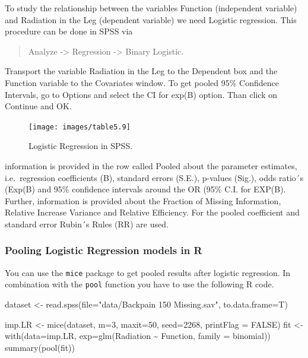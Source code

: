 \documentclass[
]{book}
\newenvironment{Shaded}{\begin{snugshade}}{\end{snugshade}}
\newcommand{\AttributeTok}[1]{\textcolor[rgb]{0.77,0.63,0.00}{#1}}
\newcommand{\ConstantTok}[1]{\textcolor[rgb]{0.00,0.00,0.00}{#1}}
\newcommand{\DecValTok}[1]{\textcolor[rgb]{0.00,0.00,0.81}{#1}}
\newcommand{\FunctionTok}[1]{\textcolor[rgb]{0.00,0.00,0.00}{#1}}
\newcommand{\NormalTok}[1]{#1}
\newcommand{\OtherTok}[1]{\textcolor[rgb]{0.56,0.35,0.01}{#1}}
\newcommand{\SpecialCharTok}[1]{\textcolor[rgb]{0.00,0.00,0.00}{#1}}
\newcommand{\StringTok}[1]{\textcolor[rgb]{0.31,0.60,0.02}{#1}}
\begin{document}
To study the relationship between the variables Function (independent variable) and Radiation in the Leg (dependent variable) we need Logistic regression. This procedure can be done in SPSS via

\begin{quote}
Analyze -\textgreater{} Regression -\textgreater{} Binary Logistic.
\end{quote}

Transport the variable Radiation in the Leg to the Dependent box and the Function variable to the Covariates window. To get pooled 95\% Confidence Intervals, go to Options and select the CI for exp(B) option. Than click on Continue and OK.

\begin{figure}

{\centering \texttt{[image: images/table5.9]} 

}

\caption{Logistic Regression in SPSS.}\label{fig:tab5-9}
\end{figure}

information is provided in the row called Pooled about the parameter estimates, i.e.~regression coefficients (B), standard errors (S.E.), p-values (Sig.), odds ratio´s (Exp(B) and 95\% confidence intervals around the OR (95\% C.I. for EXP(B). Further, information is provided about the Fraction of Missing Information, Relative Increase Variance and Relative Efficiency. For the pooled coefficient and standard error Rubin´s Rules (RR) are used.

\hypertarget{pooling-logistic-regression-models-in-r}{%
\subsubsection{Pooling Logistic Regression models in R}\label{pooling-logistic-regression-models-in-r}}

You can use the \texttt{mice} package to get pooled results after logistic regression. In combination with the \texttt{pool} function you have to use the following R code.

\begin{Shaded}
\begin{Highlighting}[]
\NormalTok{dataset }\OtherTok{\textless{}{-}} \FunctionTok{read.spss}\NormalTok{(}\AttributeTok{file=}\StringTok{"data/Backpain 150 Missing.sav"}\NormalTok{, }\AttributeTok{to.data.frame=}\NormalTok{T)}

\NormalTok{imp.LR }\OtherTok{\textless{}{-}} \FunctionTok{mice}\NormalTok{(dataset, }\AttributeTok{m=}\DecValTok{3}\NormalTok{, }\AttributeTok{maxit=}\DecValTok{50}\NormalTok{, }\AttributeTok{seed=}\DecValTok{2268}\NormalTok{, }\AttributeTok{printFlag =} \ConstantTok{FALSE}\NormalTok{)}
\NormalTok{fit }\OtherTok{\textless{}{-}} \FunctionTok{with}\NormalTok{(}\AttributeTok{data=}\NormalTok{imp.LR, }\AttributeTok{exp=}\FunctionTok{glm}\NormalTok{(Radiation }\SpecialCharTok{\textasciitilde{}}\NormalTok{ Function, }\AttributeTok{family =}\NormalTok{ binomial))}
\FunctionTok{summary}\NormalTok{(}\FunctionTok{pool}\NormalTok{(fit))}
\end{Highlighting}
\end{Shaded}
\end{document}

